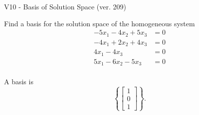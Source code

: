 \begin{exercise}
  \begin{exerciseTitle}V10 - Basis of Solution Space (ver. 209)\end{exerciseTitle}
  \begin{exerciseStatement}
    Find a basis for the solution space of the homogeneous system 
\begin{align*}
 -5 x_ 1 -4 x_ 2 + 5 x_ 3 &= 0  \\ 
  -4 x_ 1 + 2 x_ 2 + 4 x_ 3 &= 0  \\ 
  4 x_ 1 -4 x_ 3 &= 0  \\ 
  5 x_ 1 -6 x_ 2 -5 x_ 3 &= 0  \\ 
 \end{align*}


 
  \end{exerciseStatement}

  \begin{exerciseAnswer}
   A basis is   
\[\left\{\left[\begin{array}{c}
1 \\
0 \\
1
\end{array}\right]\right\}.\]

  


  \end{exerciseAnswer}
\end{exercise}